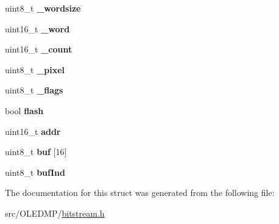 \begin{DoxyCompactItemize}
\item 
uint8\+\_\+t {\bfseries \+\_\+wordsize}\hypertarget{structbitstream__t_a1247e14eec68041248d6d71040b151a2}{}\label{structbitstream__t_a1247e14eec68041248d6d71040b151a2}

\item 
uint16\+\_\+t {\bfseries \+\_\+word}\hypertarget{structbitstream__t_a957c357acebf129016c23a180c55a138}{}\label{structbitstream__t_a957c357acebf129016c23a180c55a138}

\item 
uint16\+\_\+t {\bfseries \+\_\+count}\hypertarget{structbitstream__t_af818e6e9d7218107aa8fcf4e054c5a10}{}\label{structbitstream__t_af818e6e9d7218107aa8fcf4e054c5a10}

\item 
uint8\+\_\+t {\bfseries \+\_\+pixel}\hypertarget{structbitstream__t_a10c4ba029fe86182aa5dff53d2486072}{}\label{structbitstream__t_a10c4ba029fe86182aa5dff53d2486072}

\item 
uint8\+\_\+t {\bfseries \+\_\+flags}\hypertarget{structbitstream__t_a5629227e4392e5086f50519e78e4c973}{}\label{structbitstream__t_a5629227e4392e5086f50519e78e4c973}

\item 
bool {\bfseries flash}\hypertarget{structbitstream__t_a5a483d65b3bc3c34154e6b31c07e4aa9}{}\label{structbitstream__t_a5a483d65b3bc3c34154e6b31c07e4aa9}

\item 
uint16\+\_\+t {\bfseries addr}\hypertarget{structbitstream__t_a41a6aad09727eb120338c35535a652a6}{}\label{structbitstream__t_a41a6aad09727eb120338c35535a652a6}

\item 
uint8\+\_\+t {\bfseries buf} \mbox{[}16\mbox{]}\hypertarget{structbitstream__t_a9a9d0b69be6d96922f0cdf24457251fe}{}\label{structbitstream__t_a9a9d0b69be6d96922f0cdf24457251fe}

\item 
uint8\+\_\+t {\bfseries buf\+Ind}\hypertarget{structbitstream__t_abb854b8c5fa442b2b99efb54053fff6b}{}\label{structbitstream__t_abb854b8c5fa442b2b99efb54053fff6b}

\end{DoxyCompactItemize}


The documentation for this struct was generated from the following file\+:\begin{DoxyCompactItemize}
\item 
src/\+O\+L\+E\+D\+M\+P/\hyperlink{bitstream_8h}{bitstream.\+h}\end{DoxyCompactItemize}
